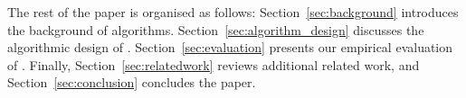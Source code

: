The rest of the paper is organised as follows: Section~\ref{sec:background} introduces the background of \dsc algorithms. Section~\ref{sec:algorithm_design} discusses the algorithmic design of \algo. Section~\ref{sec:evaluation} presents our empirical evaluation of \algo. Finally, Section~\ref{sec:relatedwork} reviews additional related work, and Section~\ref{sec:conclusion} concludes the paper.